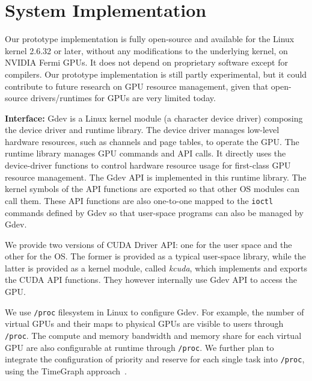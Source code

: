 \vspace{-0.25em}
\section{System Implementation}
\label{sec:implementation}
\vspace{-0.25em}

Our prototype implementation is fully open-source and available for the
Linux kernel 2.6.32 or later, without any modifications to the
underlying kernel, on NVIDIA Fermi GPUs.
It does not depend on proprietary software except for compilers.
Our prototype implementation is still partly experimental, but it could
contribute to future research on GPU resource management, given that
open-source drivers/runtimes for GPUs are very limited today.

\textbf{Interface:}
Gdev is a Linux kernel module (a character device driver) composing the
device driver and runtime library.
The device driver manages low-level hardware resources, such as channels
and page tables, to operate the GPU.
The runtime library manages GPU commands and API calls.
It directly uses the device-driver functions to control hardware
resource usage for first-class GPU resource management.
The Gdev API is implemented in this runtime library.
The kernel symbols of the API functions are exported so that other OS
modules can call them.
These API functions are also one-to-one mapped to the \texttt{ioctl}
commands defined by Gdev so that user-space programs can also be managed
by Gdev.

We provide two versions of CUDA Driver API: one for the user space and
the other for the OS.
The former is provided as a typical user-space library, while the
latter is provided as a kernel module, called \textit{kcuda},
which implements and exports the CUDA API functions.
They however internally use Gdev API to access the GPU.

We use \texttt{/proc} filesystem in Linux to configure Gdev.
For example, the number of virtual GPUs and their maps to physical GPUs
are visible to users through \texttt{/proc}.
The compute and memory bandwidth and memory share for each virtual GPU
are also configurable at runtime through \texttt{/proc}.
We further plan to integrate the configuration of priority and
reserve for each single task into \texttt{/proc}, using the TimeGraph
approach~\cite{Kato_ATC11}.

